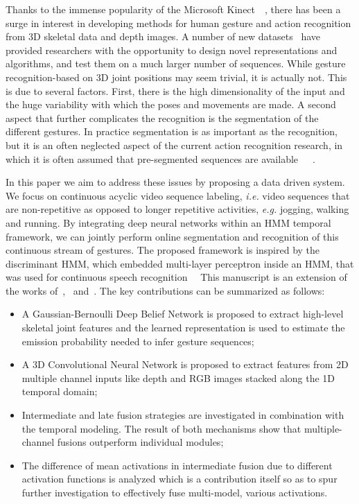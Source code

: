 Thanks to the immense popularity of the Microsoft Kinect~\cite{shotton2011real}~\cite{lingshao2}, there has been a surge in interest in developing methods for human gesture and action recognition from 3D skeletal data and depth images.
A number of new datasets~\cite{ICMI,fothergill2012instructing,guyon2012chalearn,wang2012mining} have provided researchers with the opportunity to design novel representations and algorithms, and test them on a much larger number of sequences.
While gesture recognition-based on 3D joint positions may seem trivial, it is actually not. This is due to several factors. First, there is the high dimensionality of the input and the huge variability with which the poses and movements are made.
A second aspect that further complicates the recognition is the segmentation of the different gestures. In practice segmentation is as important as the recognition, but it is an often neglected aspect of the current action recognition research, in which it is often assumed that  pre-segmented sequences are available~\cite{laptev2005space}~\cite{marszalek09}~\cite{Kuehne11}.

In this paper we aim to address these issues by proposing a data driven system. We focus on continuous acyclic video sequence labeling, \emph{i.e.} video sequences that are non-repetitive as opposed to longer repetitive activities, \textit{e.g.} jogging, walking and running. By integrating deep neural networks within an HMM temporal framework, we can jointly perform online segmentation and recognition of this continuous stream of gestures. The proposed framework is inspired by the discriminant HMM, which embedded multi-layer perceptron inside an HMM, that was used for continuous speech recognition~\cite{renals1994connectionist}~\cite{bourlard1994connectionist}
This manuscript is an extension of the works of~\cite{diwucvpr14},~\cite{wu2014deep} and~\cite{lio2014deep}.
The key contributions can be summarized as follows:
\begin{itemize}
\item A Gaussian-Bernoulli Deep Belief Network is proposed to extract high-level skeletal joint features and the learned representation is used to estimate the emission probability needed to infer gesture sequences;
\item A 3D Convolutional Neural Network  is proposed to extract features from 2D multiple channel inputs like  depth and RGB images stacked along the 1D temporal domain;
\item Intermediate and late fusion strategies are investigated in combination with the temporal modeling. The result of both mechanisms show that multiple-channel fusions outperform individual modules;
\item The difference of mean activations in intermediate fusion due to different activation functions is analyzed which is a contribution itself so as to spur further investigation to effectively fuse multi-model, various activations.
\end{itemize}

